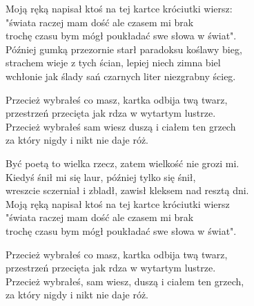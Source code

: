 \begin{text}
    Moją ręką napisał ktoś na tej kartce króciutki wiersz:\\
    "świata raczej mam dość ale czasem mi brak\\
    trochę czasu bym mógł poukładać swe słowa w świat".\\
    Później gumką przezornie starł paradoksu koślawy bieg,\\
    strachem wieje z tych ścian, lepiej niech zimna biel\\
    wchłonie jak ślady sań czarnych liter niezgrabny ścieg.

    Przecież wybrałeś co masz, kartka odbija twą twarz,\\
    przestrzeń przecięta jak rdza w wytartym lustrze.\\
    Przecież wybrałeś sam wiesz duszą i ciałem ten grzech\\
    za który nigdy i nikt nie daje róż.

    Być poetą to wielka rzecz, zatem wielkość nie grozi mi.\\
    Kiedyś śnił mi się laur, później tylko się śnił,\\
    wreszcie sczerniał i zbladł, zawisł kleksem nad resztą dni.\\
    Moją ręką napisał ktoś na tej kartce króciutki wiersz\\
    "świata raczej mam dość ale czasem mi brak\\
    trochę czasu bym mógł poukładać swe słowa w świat".

    Przecież wybrałeś co masz, kartka odbija twą twarz,\\
    przestrzeń przecięta jak rdza w wytartym lustrze.\\
    Przecież wybrałeś, sam wiesz, duszą i ciałem ten grzech,\\
    za który nigdy i nikt nie daje róż.
\end{text}
\begin{chord}

\end{chord}